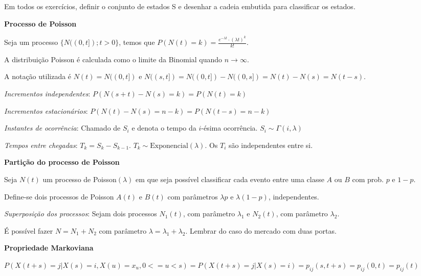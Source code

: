 \documentclass[12pt]{article}
\begin{document}
	
	\begin{multicols}{3}
		Em todos os exercícios, definir o conjunto de estados S e desenhar a cadeia embutida para classificar os estados.
		\noindent\makebox[\columnwidth]{\rule{\columnwidth}{0.4pt}}
		
		\textbf{Processo de Poisson}
		
		Seja um processo $ \{N((0, t]);t > 0\} $, temos que $ P(N(t) = k) = \frac{e^{-\lambda t} \cdot (\lambda t)^k}{k!} $. 
		
		A distribuição Poisson é calculada como o limite da Binomial quando $ n \to \infty $. 
		
		A notação utilizada é $ N(t) = N((0, t]) $ e $ N((s, t]) = N((0, t]) - N((0, s]) = N(t) - N(s) = N(t-s) $.
		
		\textit{Incrementos independentes}: $ P(N(s + t) - N(s) = k) = P(N(t) = k) $
		
		\textit{Incrementos estacionários}: $ P(N(t) - N(s) = n-k) = P(N(t-s) = n-k) $
		
		\textit{Instantes de ocorrência}: Chamado de $ S_i $ e denota o tempo da $ i $-ésima ocorrência. $ S_i \sim \Gamma(i, \lambda) $
		
		\textit{Tempos entre chegadas}: $ T_k = S_k - S_{k-1} $. $ T_k \sim \text{Exponencial}(\lambda) $. Os $ T_i $ são independentes entre si.
		
		\noindent\makebox[\columnwidth]{\rule{\columnwidth}{0.4pt}}
		
		\textbf{Partição do processo de Poisson} 
		
		Seja $ N(t) $ um processo de Poisson$ (\lambda) $ em que seja possível classificar cada evento entre uma classe $ A $ ou $ B $ com prob. $ p $ e $ 1-p $. 
		
		Define-se dois processos de Poisson $ A(t) $ e $ B(t) $ com parâmetros $ \lambda p $ e $ \lambda (1-p) $, independentes.
		
		\textit{Superposição dos processos}: Sejam dois processos $ N_1(t) $, com parâmetro $ \lambda_1 $ e $ N_2(t) $, com parâmetro $ \lambda_2 $. 
		
		É possível fazer $ N = N_1 + N_2 $ com parâmetro $ \lambda = \lambda_1 + \lambda_2 $. Lembrar do caso do mercado com duas portas.
		
		\noindent\makebox[\columnwidth]{\rule{\columnwidth}{0.4pt}}
		
		\textbf{Propriedade Markoviana} 
		
		$ P(X(t+s) = j | X(s) = i, X(u) = x_u, 0 <= u < s) = P(X(t+s) = j | X(s) = i) = p_{ij}(s, t+s) = p_{ij}(0, t) = p_{ij}(t) $
		

\end{multicols}
\end{document}
